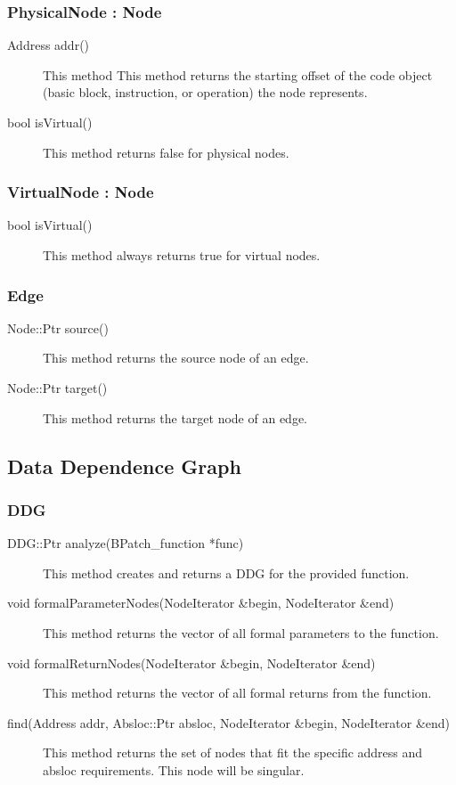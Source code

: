\documentclass[12pt]{article}
\begin{document}
\subsubsection{PhysicalNode : Node}
\begin{description}
\item[Address addr()] This method This method returns the starting
offset of the code object (basic block, instruction, or operation) the
node represents.
\item[bool isVirtual()] This method returns false for physical nodes.
\end{description}

\subsubsection{VirtualNode : Node}
\begin{description}
\item[bool isVirtual()]
This method always returns true for virtual nodes.
\end{description}

\subsubsection{Edge}
\begin{description}
\item[Node::Ptr source()]
This method returns the source node of an edge.
\item[Node::Ptr target() ]
This method returns the target node of an edge.
\end{description}

\subsection{Data Dependence Graph}
\subsubsection{DDG}
\begin{description}
\item[DDG::Ptr analyze(BPatch\_function *func)]
This method creates and returns a DDG for the provided function.
\item[void formalParameterNodes(NodeIterator \&begin, NodeIterator \&end) ]
This method returns the vector of all formal parameters to the function.
\item[void formalReturnNodes(NodeIterator \&begin, NodeIterator \&end)]
This method returns the vector of all formal returns from the function.
\item[find(Address addr, Absloc::Ptr absloc, NodeIterator \&begin, NodeIterator \&end) ]
This method returns the set of nodes that fit the specific address and absloc requirements. This node will be singular. 
\end{description}
\end{document}
